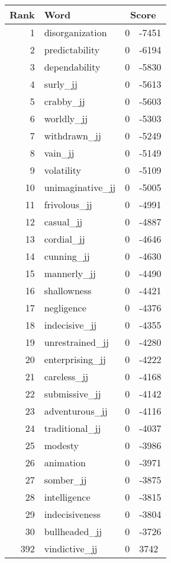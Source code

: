 \begin{longtable}[!htbp]{| rlr@{.}l |}
    \hline
    \textbf{Rank} & \textbf{Word} & \multicolumn{2}{c|}{\textbf{Score}} \\
    \hline
    \endhead
    1 & disorganization & 0 & -7451 \\
    2 & predictability & 0 & -6194 \\
    3 & dependability & 0 & -5830 \\
    4 & surly\_jj & 0 & -5613 \\
    5 & crabby\_jj & 0 & -5603 \\
    6 & worldly\_jj & 0 & -5303 \\
    7 & withdrawn\_jj & 0 & -5249 \\
    8 & vain\_jj & 0 & -5149 \\
    9 & volatility & 0 & -5109 \\
    10 & unimaginative\_jj & 0 & -5005 \\
    11 & frivolous\_jj & 0 & -4991 \\
    12 & casual\_jj & 0 & -4887 \\
    13 & cordial\_jj & 0 & -4646 \\
    14 & cunning\_jj & 0 & -4630 \\
    15 & mannerly\_jj & 0 & -4490 \\
    16 & shallowness & 0 & -4421 \\
    17 & negligence & 0 & -4376 \\
    18 & indecisive\_jj & 0 & -4355 \\
    19 & unrestrained\_jj & 0 & -4280 \\
    20 & enterprising\_jj & 0 & -4222 \\
    21 & careless\_jj & 0 & -4168 \\
    22 & submissive\_jj & 0 & -4142 \\
    23 & adventurous\_jj & 0 & -4116 \\
    24 & traditional\_jj & 0 & -4037 \\
    25 & modesty & 0 & -3986 \\
    26 & animation & 0 & -3971 \\
    27 & somber\_jj & 0 & -3875 \\
    28 & intelligence & 0 & -3815 \\
    29 & indecisiveness & 0 & -3804 \\
    30 & bullheaded\_jj & 0 & -3726 \\
    392 & vindictive\_jj & 0 & 3742 \\

\end{longtable}
